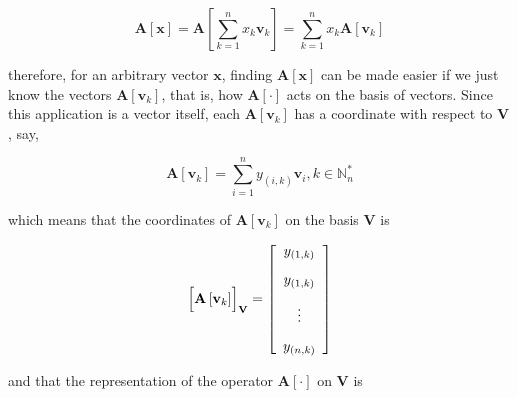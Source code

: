 \begin{equation} \mathbf{A}\left[\mathbf{x}\right] = \mathbf{A}\left[\sum\limits_{k=1}^n x_k\mathbf{v}_k\right] = \sum\limits_{k=1}^n x_k \mathbf{A}\left[\mathbf{v}_k\right] \label{eq:application_decomp_1}\end{equation}

	\noindent therefore, for an arbitrary vector $\mathbf{x}$, finding $\mathbf{A}\left[\mathbf{x}\right]$ can be made easier if we just know the vectors $\mathbf{A}\left[\mathbf{v}_k\right]$, that is, how $\mathbf{A}\left[\cdot\right]$ acts on the basis of vectors. Since this application is a vector itself, each $\mathbf{A}\left[\mathbf{v}_k\right]$ has a coordinate with respect to $\mathbf{V}$, say, 

	\begin{equation} \mathbf{A}\left[\mathbf{v}_k\right] = \sum\limits_{i=1}^n y_{\left(i,k\right)} \mathbf{v}_i , k\in\mathbb{N}_n^*\label{eq:application_decomp_2}\end{equation}

	\noindent which means that the coordinates of $\mathbf{A}\left[\mathbf{v}_k\right]$ on the basis $\mathbf{V}$ is

\begin{equation} \left[\raisebox{1mm}[2mm][2mm]{} \mathbf{A}\left[\mathbf{v}_k\right]\right]_\mathbf{V} = \left[\begin{array}{c} y_{\left(1,k\right)} \\[3mm] y_{\left(1,k\right)} \\[3mm] \vdots \\[3mm] y_{\left(n,k\right)} \end{array}\right] \end{equation}

	and that the representation of the operator $\mathbf{A}\left[\cdot\right]$ on $\mathbf{V}$ is 

